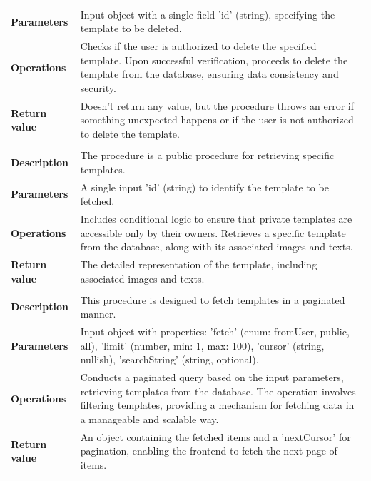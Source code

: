 \begin{longtable}{@{}>{\raggedright\arraybackslash}p{3cm} p{11cm}}
    \\
    \textbf{Parameters}   & Input object with a single field 'id' (string), specifying the template to be deleted.
    \\
    \textbf{Operations}   & Checks if the user is authorized to delete the specified template. Upon successful verification, proceeds to delete the template from the database, ensuring data consistency and security.
    \\
    \textbf{Return value} & Doesn't return any value, but the procedure throws an error if something unexpected happens or if the user is not authorized to delete the template.
    \\
    \hline
    \multicolumn{2}{c}{\textbf{getTemplate}}
    \\
    \hline
    \textbf{Description}  & The procedure is a public procedure for retrieving specific templates.
    \\
    \textbf{Parameters}   & A single input 'id' (string) to identify the template to be fetched.
    \\
    \textbf{Operations}   & Includes conditional logic to ensure that private templates are accessible only by their owners. Retrieves a specific template from the database, along with its associated images and texts.
    \\
    \textbf{Return value} & The detailed representation of the template, including associated images and texts.
    \\
    \hline
    \multicolumn{2}{c}{\textbf{getInfiniteTemplates}}
    \\
    \hline
    \textbf{Description}  & This procedure is designed to fetch templates in a paginated manner.
    \\
    \textbf{Parameters}   & Input object with properties: 'fetch' (enum: fromUser, public, all), 'limit' (number, min: 1, max: 100), 'cursor' (string, nullish), 'searchString' (string, optional).
    \\
    \textbf{Operations}   & Conducts a paginated query based on the input parameters, retrieving templates from the database. The operation involves filtering templates, providing a mechanism for fetching data in a manageable and scalable way.
    \\
    \textbf{Return value} & An object containing the fetched items and a 'nextCursor' for pagination, enabling the frontend to fetch the next page of items.
    \\
\end{longtable}

